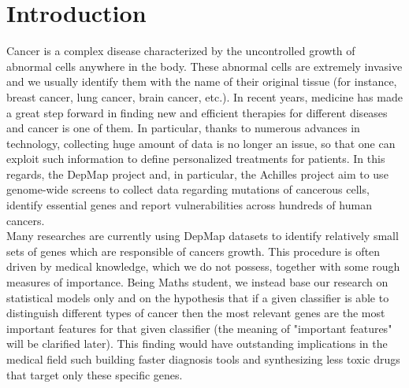 \documentclass[a4paper,11pt, oneside]{article}  %
\begin{document}


\section{Introduction}
Cancer is a complex disease characterized by the uncontrolled growth of abnormal cells anywhere in the body. These abnormal cells are extremely invasive and we usually identify them with the name of their original tissue (for instance, breast cancer,  lung cancer,  brain cancer, etc.).  In recent years,  medicine has made a great step forward in finding new and efficient therapies for different diseases and cancer is one of them.  In particular,  thanks to numerous advances in technology,  collecting huge amount of data is no longer an issue,  so that one can exploit such information to define personalized treatments for patients.  In this regards,  the DepMap project and,  in particular,  the Achilles project aim to use genome-wide screens to collect data regarding mutations of cancerous cells,  identify essential genes and report vulnerabilities across hundreds of human cancers.  \\
 
Many researches are currently using DepMap datasets to identify relatively small sets of genes which are responsible of cancers growth. This procedure is often driven by medical knowledge,  which we do not possess,  together with some rough measures of importance.  Being Maths student,  we instead base our research on statistical models only  and on the hypothesis that if a given classifier is able to distinguish different types of cancer then the most relevant genes are the most important features for that given classifier (the meaning of "important features" will be clarified later).  This finding would have outstanding implications in the medical field such building faster diagnosis tools and synthesizing less toxic drugs that target only these specific genes. 
\end{document}
